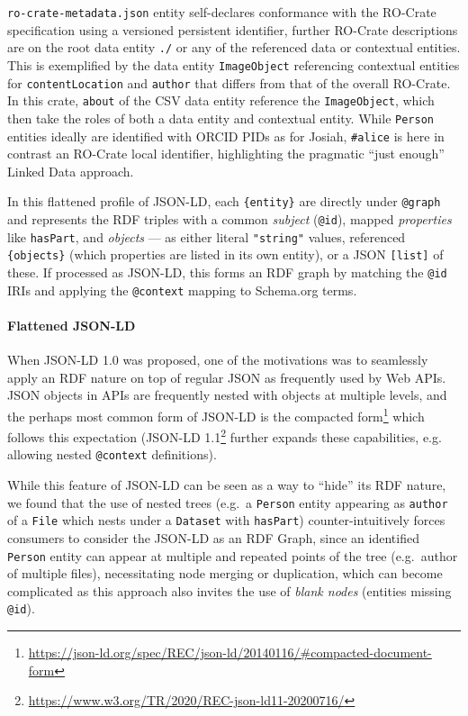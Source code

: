 \begin{listing}
{  \texttt{ro-crate-metadata.json} entity self-declares conformance with the
  RO-Crate specification using a versioned persistent identifier, further
  RO-Crate descriptions are on the root data entity \texttt{./} or any of the
  referenced data or contextual entities. This is exemplified by the data
  entity \texttt{ImageObject} referencing contextual entities for
  \texttt{contentLocation} and \texttt{author} that differs from that of the overall
  RO-Crate. In this crate, \texttt{about} of the CSV data entity reference the
  \texttt{ImageObject}, which then take the roles of both a data entity and
  contextual entity. While \texttt{Person} entities ideally are identified with
  ORCID PIDs as for Josiah, \texttt{\#alice} is here in contrast an RO-Crate
  local identifier, highlighting the pragmatic ``just enough'' Linked
  Data approach.}
  \label{ch5:lis1}
\end{listing}
  

In this flattened profile of JSON-LD, each \texttt{\{entity\}} are
directly under \texttt{@graph} and represents the RDF triples with a
common \emph{subject} (\texttt{@id}), mapped \emph{properties} like
\texttt{hasPart}, and \emph{objects} --- as either literal
\texttt{"string"} values, referenced \texttt{\{objects\}} (which
properties are listed in its own entity), or a JSON \texttt{{[}list{]}}
of these. If processed as JSON-LD, this forms an RDF graph by matching
the \texttt{@id} IRIs and applying the \texttt{@context} mapping to
Schema.org terms. \normalsize

\paragraph{Flattened JSON-LD}\label{ch5:flattened-json-ld}

When JSON-LD 1.0 \cite{w3-ldp}
was
proposed, one of the motivations was to seamlessly apply an RDF nature
on top of regular JSON as frequently used by Web APIs. JSON objects in
APIs are frequently nested with objects at multiple levels, and the
perhaps most common form of JSON-LD is the compacted
form\footnote{\url{https://json-ld.org/spec/REC/json-ld/20140116/\#compacted-document-form}}
which follows this expectation (JSON-LD
1.1\footnote{\url{https://www.w3.org/TR/2020/REC-json-ld11-20200716/}} further
expands these capabilities, e.g. allowing nested \texttt{@context} definitions).


While this feature of JSON-LD can be seen as a way to ``hide'' its RDF
nature, we found that the use of nested trees (e.g.~a \texttt{Person}
entity appearing as \texttt{author} of a \texttt{File} which nests under
a \texttt{Dataset} with \texttt{hasPart}) counter-intuitively forces
consumers to consider the JSON-LD as an RDF Graph, since an identified
\texttt{Person} entity can appear at multiple and repeated points of the
tree (e.g.~author of multiple files), necessitating node merging or
duplication, which can become complicated as this approach also invites
the use of \emph{blank nodes} (entities missing \texttt{@id}).

